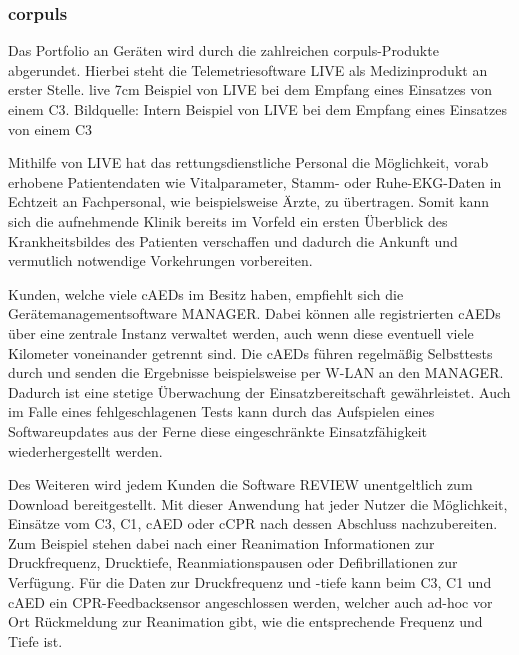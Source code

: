\subsubsection{\textsf{corpuls\color{corpulsred}{.web}}}
Das Portfolio an Geräten wird durch die zahlreichen \textsf{corpuls\color{corpulsred}{.web}}-Produkte abgerundet.
Hierbei steht die Telemetriesoftware \gls{LIVE} als Medizinprodukt an erster Stelle.
\bild
{live}
{7cm}
{Beispiel von \acrlong{LIVE} bei dem Empfang eines Einsatzes von einem \acrlong{C3}. Bildquelle: Intern}
{Beispiel von \acrlong*{LIVE} bei dem Empfang eines Einsatzes von einem \acrlong*{C3}}

Mithilfe von \gls{LIVE} hat das rettungsdienstliche Personal die Möglichkeit, vorab erhobene Patientendaten wie Vitalparameter, Stamm- oder Ruhe-EKG-Daten in Echtzeit an Fachpersonal, wie beispielsweise Ärzte, zu übertragen.
Somit kann sich die aufnehmende Klinik bereits im Vorfeld ein ersten Überblick des Krankheitsbildes des Patienten verschaffen und dadurch die Ankunft und vermutlich notwendige Vorkehrungen vorbereiten.


Kunden, welche viele \gls{cAED}s im Besitz haben, empfiehlt sich die Gerätemanagementsoftware \gls{MANAGER}.
Dabei können alle registrierten \gls{cAED}s über eine zentrale Instanz verwaltet werden, auch wenn diese eventuell viele Kilometer voneinander getrennt sind.
Die \gls{cAED}s führen regelmäßig Selbsttests durch und senden die Ergebnisse beispielsweise per W-LAN an den \gls{MANAGER}.
Dadurch ist eine stetige Überwachung der Einsatzbereitschaft gewährleistet.
Auch im Falle eines fehlgeschlagenen Tests kann durch das Aufspielen eines Softwareupdates aus der Ferne diese eingeschränkte Einsatzfähigkeit wiederhergestellt werden.

Des Weiteren wird jedem Kunden die Software \gls{REVIEW} unentgeltlich zum Download bereitgestellt.
Mit dieser Anwendung hat jeder Nutzer die Möglichkeit, Einsätze vom \gls{C3}, \gls{C1}, \gls{cAED} oder \gls{cCPR} nach dessen Abschluss nachzubereiten.
Zum Beispiel stehen dabei nach einer Reanimation Informationen zur Druckfrequenz, Drucktiefe, Reanmiationspausen oder Defibrillationen zur Verfügung.
Für die Daten zur Druckfrequenz und -tiefe kann beim \gls{C3}, \gls{C1} und \gls{cAED} ein CPR-Feedbacksensor angeschlossen werden, welcher auch ad-hoc vor Ort Rückmeldung zur Reanimation gibt, wie die entsprechende Frequenz und Tiefe ist.


